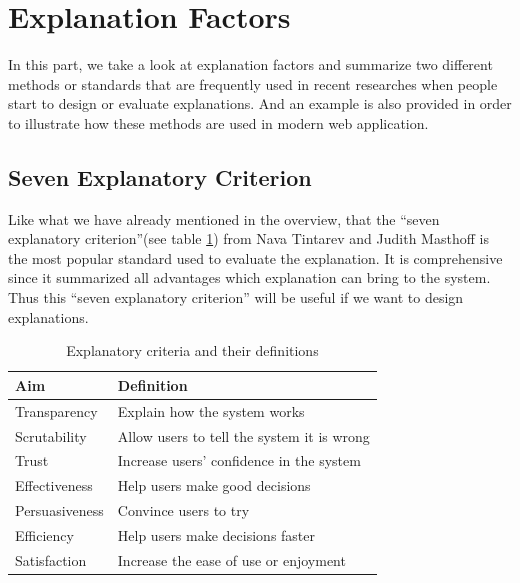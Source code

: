 \section{Explanation Factors}
    In this part, we take a look at explanation factors and summarize two different
    methods or standards that are frequently used in recent researches when people start to design or evaluate
    explanations. And an example is also provided in order to illustrate how 
    these methods are used in modern web application.
    \subsection{Seven Explanatory Criterion}

        \indent 
        Like what we have already mentioned in the overview, that the ``seven explanatory criterion''\cite{tintarev2007survey}(see table \ref{table:1}) from Nava Tintarev and Judith Masthoff
        is the most popular standard used to evaluate the explanation. 
        It is comprehensive since it summarized all advantages which explanation can bring to the system. 
        Thus this ``seven explanatory criterion'' will be useful if we want to design explanations.
        \begin{table}[ht] 
            \centering
            \begin{tabular}{ | m{8em} | m{4cm} | }
            \hline
            \bfseries Aim & \bfseries Definition\\ [0.5ex] 
            \hline\hline
            Transparency & Explain how the system works\\ 
            \hline
            Scrutability & Allow users to tell the system it is wrong\\ 
            \hline
            Trust & Increase users' confidence in the system\\ 
            \hline
            Effectiveness & Help users make good decisions\\ 
            \hline
            Persuasiveness & Convince users to try\\ 
            \hline
            Efficiency & Help users make decisions faster\\ 
            \hline
            Satisfaction & Increase the ease of use or enjoyment\\ 
            \hline
            \end{tabular}
            \caption{Explanatory criteria and their definitions}
            \label{table:1}
        \end{table}

